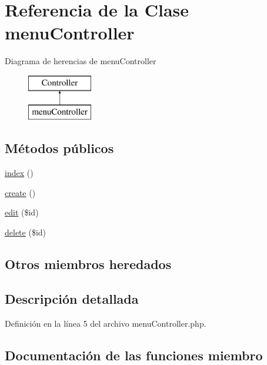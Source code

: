 \hypertarget{classmenu_controller}{}\section{Referencia de la Clase menu\+Controller}
\label{classmenu_controller}
Diagrama de herencias de menu\+Controller\begin{figure}[H]
\begin{center}
\leavevmode
\includegraphics[height=2.000000cm]{classmenu_controller}
\end{center}
\end{figure}
\subsection*{Métodos públicos}
\begin{DoxyCompactItemize}
\item 
\mbox{\hyperlink{classmenu_controller_a2b51402e97607111f6674ca41be2e77a}{index}} ()
\item 
\mbox{\hyperlink{classmenu_controller_a9de27fd704a75ea2e20f1897efbe50fa}{create}} ()
\item 
\mbox{\hyperlink{classmenu_controller_a302abc24e5cf18433bffd1b3eae79dd1}{edit}} (\$id)
\item 
\mbox{\hyperlink{classmenu_controller_a3e835912cd6cdd07fd0eb71bac19c675}{delete}} (\$id)
\end{DoxyCompactItemize}
\subsection*{Otros miembros heredados}


\subsection{Descripción detallada}


Definición en la línea 5 del archivo menu\+Controller.\+php.



\subsection{Documentación de las funciones miembro}
\mbox{\label{classmenu_controller_a9de27fd704a75ea2e20f1897efbe50fa}} 
